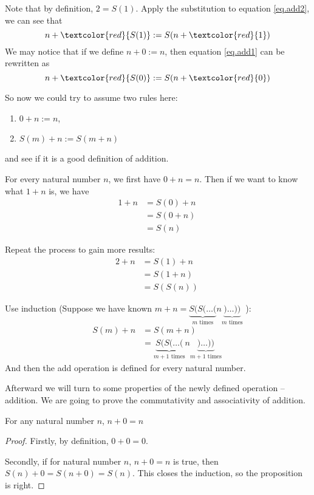 Note that by definition, $2=S(1)$. Apply the substitution to equation \ref{eq.add2}, we can see that 
\[
n + \textcolor{red}{S(1)} := S(n+\textcolor{red}{1})
\] We may notice that if we define $n+0 := n$, then equation \ref{eq.add1} can be rewritten as 
\[
n + \textcolor{red}{S(0)} := S(n+\textcolor{red}{0})
\]

So now we could try to assume two rules here:
\begin{definition}
\begin{enumerate}
\item $0+n:=n$,
\item $S(m)+n:=S(m+n)$
\end{enumerate}
\end{definition} and see if it is a good definition of addition.

For every natural number $n$, we first have $0+n=n$. Then if we want to know what $1+n$ is, we have
\begin{align*}
1+n 
&= S(0)+n\ \tag{By Def.~of 1} \\
&= S(0+n)\ \tag{By the second rule} \\
&= S(n)\ \tag{By the first rule}
\end{align*}

Repeat the process to gain more results:
\begin{align*}
2+n 
&= S(1)+n\ \tag{By Def.~of 2} \\
&= S(1+n)\ \tag{By the second rule} \\
&= S(S(n))\ \tag{By the result of \(1+n\)}
\end{align*}

Use induction (Suppose we have known 
$m+n=\underbrace{S(S(\dots(}_{m \text{ times}}n\underbrace{)\dots))}_{m \text{ times}}$ ):
\begin{align*}
S(m)+n
&= S(m+n)\ \tag{By the second rule} \\
&=\underbrace{S(S(\dots(}_{m+1 \text{ times}}n\underbrace{)\dots))}_{m+1 \text{ times}}\ 
\tag{By the result of \(m+n\)}
\end{align*}
And then the add operation is defined for every natural number.

Afterward we will turn to some properties of the newly defined operation -- addition. We are going to 
prove the commutativity and associativity of addition.

\begin{lem}
For any natural number $n$, $n+0=n$
\end{lem}
\begin{proof}
Firstly, by definition, $0 + 0 = 0$.

Secondly, if for natural number $n$, $n+0=n$ is true, then $S(n)+0=S(n+0)=S(n)$. This closes the 
induction, so the proposition is right. \qedhere
\end{proof}

